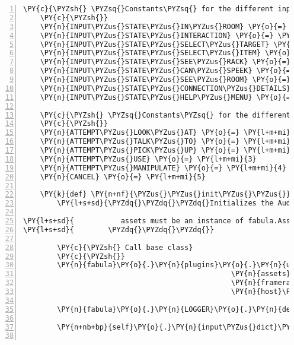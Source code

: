 \begin{Verbatim}[commandchars=\\\{\},numbers=left,firstnumber=1,stepnumber=1]
    \PY{c}{\PYZsh{} \PYZsq{}Constants\PYZsq{} for the different input states:}
    \PY{c}{\PYZsh{}}
    \PY{n}{INPUT\PYZus{}STATE\PYZus{}IN\PYZus{}ROOM} \PY{o}{=} \PY{l+m+mi}{0}
    \PY{n}{INPUT\PYZus{}STATE\PYZus{}INTERACTION} \PY{o}{=} \PY{l+m+mi}{1}
    \PY{n}{INPUT\PYZus{}STATE\PYZus{}SELECT\PYZus{}TARGET} \PY{o}{=} \PY{l+m+mi}{2}
    \PY{n}{INPUT\PYZus{}STATE\PYZus{}SELECT\PYZus{}ITEM} \PY{o}{=} \PY{l+m+mi}{3}
    \PY{n}{INPUT\PYZus{}STATE\PYZus{}SEE\PYZus{}RACK} \PY{o}{=} \PY{l+m+mi}{4}
    \PY{n}{INPUT\PYZus{}STATE\PYZus{}CAN\PYZus{}SPEEK} \PY{o}{=} \PY{l+m+mi}{5}
    \PY{n}{INPUT\PYZus{}STATE\PYZus{}SEE\PYZus{}ROOM} \PY{o}{=} \PY{l+m+mi}{6}
    \PY{n}{INPUT\PYZus{}STATE\PYZus{}CONNECTION\PYZus{}DETAILS} \PY{o}{=} \PY{l+m+mi}{7}
    \PY{n}{INPUT\PYZus{}STATE\PYZus{}HELP\PYZus{}MENU} \PY{o}{=} \PY{l+m+mi}{8}

    \PY{c}{\PYZsh{} \PYZsq{}Constants\PYZsq{} for the different attempt actions:}
    \PY{c}{\PYZsh{}}
    \PY{n}{ATTEMPT\PYZus{}LOOK\PYZus{}AT} \PY{o}{=} \PY{l+m+mi}{0}
    \PY{n}{ATTEMPT\PYZus{}TALK\PYZus{}TO} \PY{o}{=} \PY{l+m+mi}{1}
    \PY{n}{ATTEMPT\PYZus{}PICK\PYZus{}UP} \PY{o}{=} \PY{l+m+mi}{2}
    \PY{n}{ATTEMPT\PYZus{}USE} \PY{o}{=} \PY{l+m+mi}{3}
    \PY{n}{ATTEMPT\PYZus{}MANIPULATE} \PY{o}{=} \PY{l+m+mi}{4}
    \PY{n}{CANCEL} \PY{o}{=} \PY{l+m+mi}{5}

    \PY{k}{def} \PY{n+nf}{\PYZus{}\PYZus{}init\PYZus{}\PYZus{}}\PY{p}{(}\PY{n+nb+bp}{self}\PY{p}{,} \PY{n}{assets}\PY{p}{,} \PY{n}{framerate}\PY{p}{,} \PY{n}{host}\PY{p}{)}\PY{p}{:}
        \PY{l+s+sd}{\PYZdq{}\PYZdq{}\PYZdq{}Initializes the AudioUserInterface.}

\PY{l+s+sd}{           assets must be an instance of fabula.Assets or a subclass.}
\PY{l+s+sd}{        \PYZdq{}\PYZdq{}\PYZdq{}}

        \PY{c}{\PYZsh{} Call base class}
        \PY{c}{\PYZsh{}}
        \PY{n}{fabula}\PY{o}{.}\PY{n}{plugins}\PY{o}{.}\PY{n}{ui}\PY{o}{.}\PY{n}{UserInterface}\PY{o}{.}\PY{n}{\PYZus{}\PYZus{}init\PYZus{}\PYZus{}}\PY{p}{(}\PY{n+nb+bp}{self}\PY{p}{,}
                                                 \PY{n}{assets}\PY{p}{,}
                                                 \PY{n}{framerate}\PY{p}{,}
                                                 \PY{n}{host}\PY{p}{)}

        \PY{n}{fabula}\PY{o}{.}\PY{n}{LOGGER}\PY{o}{.}\PY{n}{debug}\PY{p}{(}\PY{l+s}{\PYZdq{}}\PY{l+s}{called}\PY{l+s}{\PYZdq{}}\PY{p}{)}

        \PY{n+nb+bp}{self}\PY{o}{.}\PY{n}{input\PYZus{}dict}\PY{p}{[}\PY{l+s}{\PYZsq{}}\PY{l+s}{keyboard}\PY{l+s}{\PYZsq{}}\PY{p}{]} \PY{o}{=} \PY{n+nb+bp}{True}


\end{Verbatim}
